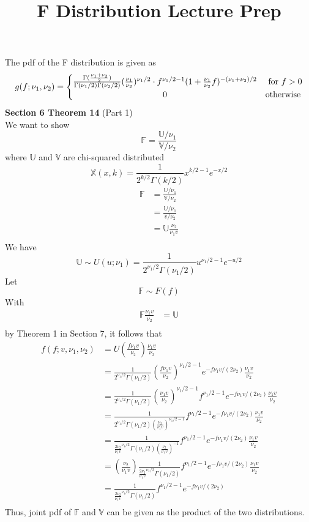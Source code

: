 \documentclass[a4paper]{article}
\title{F Distribution Lecture Prep}
\begin{document}
The pdf of the F distribution is given as 
\[
 g(f; \nu_{1}, \nu_{2}) =
 \begin{cases} 
      \hfill \frac{\Gamma(\frac{\nu_{1} + \nu_{2}}{2})}{\Gamma(\nu_{1}/2)\Gamma(\nu_{2}/2)} (\frac{\nu_{1}}{\nu_{2}})^{\nu_1/2} \cdot f^{\nu_{1}/2 - 1} (1 + \frac{\nu_1}{\nu_2}f)^{-(\nu_{1} + \nu_{2})/2}   \hfill & \text{ for $f > 0$} \\
      \hfill 0 \hfill & \text{otherwise} \\
  \end{cases}
\]
\textbf{Section 6 Theorem 14} (Part 1)\\
We want to show
\[
\mathbb{F} = \frac{\mathbb{U}/\nu_{1}}{\mathbb{V}/\nu_{2}}
\]
where $\mathbb{U}$ and $\mathbb{V}$ are chi-squared distributed
\[
\mathbb{X}(x,k) = \frac{1}{2^{k/2}\Gamma(k/2)} x^{k/2-1} e^{-x/2}
\]
\begin{align*}
\mathbb{F} 
&= \frac{\mathbb{U}/\nu_{1}}{\mathbb{V}/\nu_{2}} \\
&= \frac{\mathbb{U}/\nu_{1}}{v/\nu_{2}} \\
&= \mathbb{U} \frac{\nu_{2}}{\nu_{1}v} \\
\end{align*}
We have
\[
\mathbb{U} \sim U(u; \nu_{1}) = \frac{1}{2^{\nu_{1}/2}\Gamma(\nu_{1}/2)} u^{\nu_{1}/2-1} e^{-u/2}
\]
Let 
\[
\mathbb{F} \sim F(f)
\]
With
\begin{align*}
\mathbb{F} \frac{\nu_{1}v}{\nu_{2}}
&= \mathbb{U} \\
\end{align*}
by Theorem 1 in Section 7, it follows that
\begin{align*}
f(f; v, \nu_1, \nu_2) 
&= U(\frac{f\nu_{1}v}{\nu_{2}}) \frac{\nu_{1}v}{\nu_{2}}\\
&= \frac{1}{2^{\nu_{1}/2}\Gamma(\nu_{1}/2)} (\frac{f\nu_{1}v}{\nu_{2}})^{\nu_{1}/2-1} e^{-f\nu_{1}v/(2\nu_{2})} \frac{\nu_{1}v}{\nu_{2}}\\
&= \frac{1}{2^{\nu_{1}/2}\Gamma(\nu_{1}/2)} (\frac{\nu_{1}v}{\nu_{2}})^{\nu_{1}/2-1}f^{\nu_{1}/2-1} e^{-f\nu_{1}v/(2\nu_{2})} \frac{\nu_{1}v}{\nu_{2}}\\
&= \frac{1}{2^{\nu_{1}/2}\Gamma(\nu_{1}/2)(\frac{\nu_{2}}{\nu_{1}v})^{\nu_{1}/2-1}} f^{\nu_{1}/2-1} e^{-f\nu_{1}v/(2\nu_{2})} \frac{\nu_{1}v}{\nu_{2}}\\
&= \frac{1}{\frac{2\nu_{2}}{\nu_{1}v}^{\nu_{1}/2}\Gamma(\nu_{1}/2)(\frac{\nu_{2}}{\nu_{1}v})^{-1}} f^{\nu_{1}/2-1} e^{-f\nu_{1}v/(2\nu_{2})} \frac{\nu_{1}v}{\nu_{2}}\\
&= (\frac{\nu_{2}}{\nu_{1}v}) \frac{1}{\frac{2\nu_{2}}{\nu_{1}v}^{\nu_{1}/2}\Gamma(\nu_{1}/2)} f^{\nu_{1}/2-1} e^{-f\nu_{1}v/(2\nu_{2})} \frac{\nu_{1}v}{\nu_{2}}\\
&= \frac{1}{\frac{2\nu_{2}}{\nu_{1}v}^{\nu_{1}/2}\Gamma(\nu_{1}/2)} f^{\nu_{1}/2-1} e^{-f\nu_{1}v/(2\nu_{2})} \\
\end{align*}
Thus, joint pdf of $\mathbb{F}$ and $\mathbb{V}$ can be given as the product of the two distributions.
\end{document}
